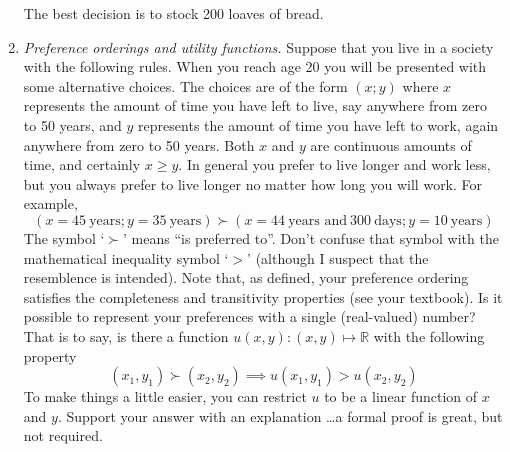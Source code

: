 \begin{enumerate}
\begin{solution}
The best decision is to stock 200 loaves of bread.
\end{solution}

\item \emph{Preference orderings and utility functions.}  Suppose that
  you live in a society with the following rules. When you reach age
  20 you will be presented with some alternative choices. The choices
  are of the form $(x;y)$ where $x$ represents the amount of time you
  have left to live, say anywhere from zero to 50 years, and $y$
  represents the amount of time you have left to work, again anywhere
  from zero to 50 years. Both $x$ and $y$ are continuous amounts of
  time, and certainly $x \ge y$. In general you prefer to live longer
  and work less, but you always prefer to live longer no matter how
  long you will work. For example,
  \[
  (x=45~\text{years}; y=35~\text{years}) \succ (x=44~\text{years and}~300~\text{days};y=10~\text{years})
  \]
  The symbol `$\succ$' means ``is preferred to''.  Don't confuse that
  symbol with the mathematical inequality symbol `$>$' (although I
  suspect that the resemblence is intended). Note that, as defined, your
  preference ordering satisfies the completeness and transitivity
  properties (see your textbook). Is it possible to represent your
  preferences with a single (real-valued) number? That is to say, is
  there a function $u(x,y) : (x,y) \mapsto \mathbb{R}$ with the
  following property
  \[
  (x_1,y_1) \succ (x_2,y_2) \implies u(x_1,y_1) > u(x_2,y_2)
  \]
  To make things a little easier, you can restrict $u$ to be a linear
  function of $x$ and $y$. Support your answer with an explanation
  \ldots a formal proof is great, but not required.


\end{enumerate}
